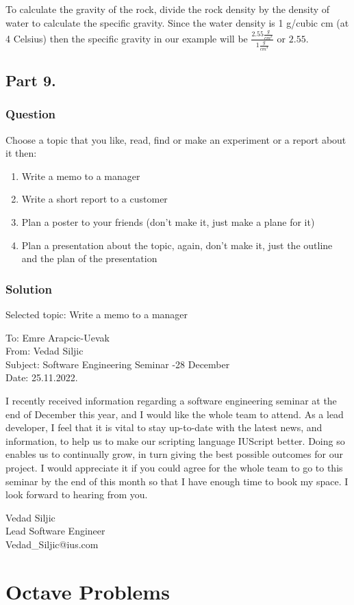 \documentclass[a4paper, 10pt]{article}
\newcommand{\volumeUnit}[0]{\frac{g}{cm^{3}}}
\begin{document}
				\noindent To calculate the gravity of the rock, divide the rock density by the density of water to calculate the specific gravity. Since the water density is 1 g/cubic cm (at 4 Celsius) then the specific gravity in our example will be $\frac{2.55\volumeUnit}{1\volumeUnit}$ or $2.55$.
				
		\subsection{Part 9.}
			\subsubsection{Question}
				\noindent Choose a topic that you like, read, find or make an experiment or a report about it then:
				\begin{enumerate}
					\item Write a memo to a manager
					\item Write a short report to a customer
					\item Plan a poster to your friends (don’t make it, just make a plane for it)
					\item Plan a presentation about the topic, again, don’t make it, just the outline and the plan of the presentation
				\end{enumerate}
			\subsubsection{Solution}
				\noindent Selected topic: Write a memo to a manager
				\begin{tcolorbox}[colback=red!5!white,colframe=red!75!black,title=Memo To My Manager]
					To: Emre Arapcic-Uevak\\
					From: Vedad Siljic\\
					Subject: Software Engineering Seminar -28 December\\
					Date: 25.11.2022.\\
					\hspace{3mm}
					
					I recently received information regarding a software engineering seminar at the end of December this year, and I would like the whole team to attend.
					As a lead developer, I feel that it is vital to stay up-to-date with the latest news, and information, to help us to make our scripting language IUScript better. Doing so enables us to continually grow, in turn giving the best possible outcomes for our project.
					I would appreciate it if you could agree for the whole team to go to this seminar by the end of this month so that I have enough time to book my space.
					I look forward to hearing from you.
					
					\tcblower
					Vedad Siljic\\
					Lead Software Engineer\\
					Vedad_Siljic@ius.com				
				\end{tcolorbox}
		\pagebreak
		\section{Octave Problems}
\end{document}
